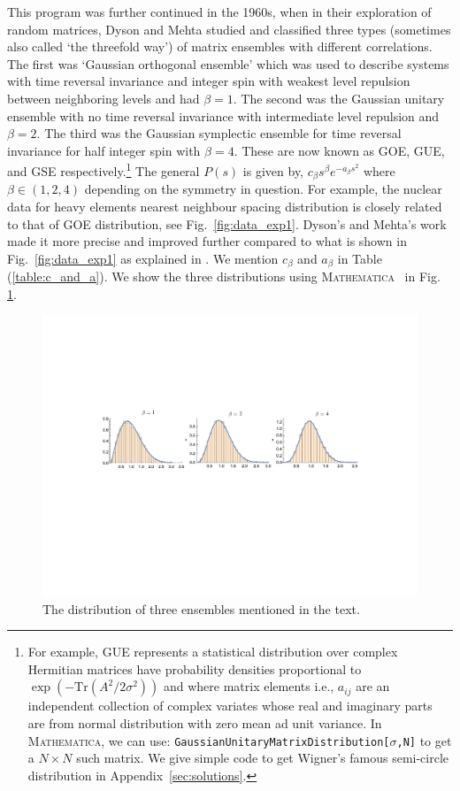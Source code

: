 \documentclass[11pt]{article}
\newcommand{\MA}{\textsc{Mathematica}}
\begin{document}
This program was further continued in the 1960s, when in their exploration of random matrices, 
Dyson and Mehta studied and classified three types (sometimes also called `the threefold way') 
of matrix ensembles with different correlations. The first was `Gaussian orthogonal ensemble' which was used to describe systems with time reversal invariance and integer spin with weakest level repulsion between neighboring levels and had $\beta=1$. The second was the Gaussian unitary ensemble with no time reversal invariance with intermediate level repulsion and $\beta=2$. The third was the Gaussian symplectic ensemble for time reversal invariance for half integer spin with $\beta=4$. These are now known as GOE, GUE, and GSE respectively.\footnote{For example, GUE represents a statistical distribution over complex Hermitian matrices 
have probability densities proportional to $ \exp(-\mbox{Tr}(A^2/2\sigma^2))$ and
where matrix elements i.e., $a_{ij}$ are an independent collection of complex 
variates whose real and imaginary parts are from normal distribution
with zero mean ad unit variance. In \MA, we can use: 
\texttt{GaussianUnitaryMatrixDistribution[$\sigma$,N]}
to get a $N \times N$ such matrix. We give simple code to get Wigner's famous semi-circle
distribution in Appendix~\ref{sec:solutions}.} 
The general $P(s)$ is given by, $c_{\beta}s^{\beta} e^{-a_{\beta}s^2}$ 
where $\beta \in (1,2,4)$ depending on the symmetry in question. 
For example, the nuclear data for heavy elements nearest neighbour spacing distribution
is closely related to that of GOE distribution, see Fig.~\ref{fig:data_exp1}. 
Dyson's and Mehta's work made it more precise and improved further 
compared to what is shown in Fig.~\ref{fig:data_exp1} as explained in 
\cite{PhysRevLett.48.1086}. We mention $c_{\beta}$ and  $a_{\beta}$ in Table (\ref{table:c_and_a}). 
We show the three distributions using \MA~ in Fig. \ref{fig:ensem1}.  

\begin{figure}[htbp] 
	\centering 
	\includegraphics[width=1.05\textwidth]{figs/ensem.pdf}
	\caption{\label{fig:ensem1}The distribution of three ensembles mentioned in the text.}
\end{figure}
\end{document}
